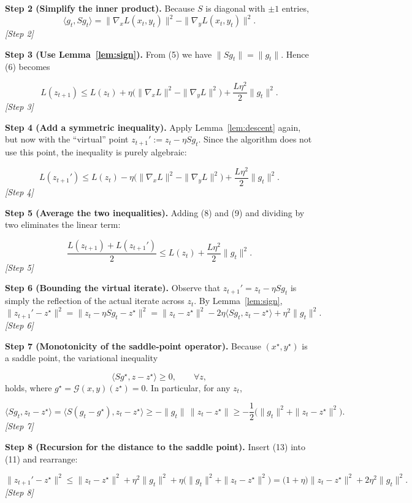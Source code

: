 \documentclass{article}
\newcommand{\G}{\mathcal{G}(x,y)}
\begin{document}
\noindent\textbf{Step 2 (Simplify the inner product).}  
Because \(S\) is diagonal with \(\pm1\) entries,
\[
\langle g_t,Sg_t\rangle
= \|\nabla_x L(x_t,y_t)\|^{2}-\|\nabla_y L(x_t,y_t)\|^{2}.
\tag{7}
\]
\textit{[Step 2]}

\noindent\textbf{Step 3 (Use Lemma~\ref{lem:sign}).}  
From (5) we have \(\|Sg_t\|=\|g_t\|\). Hence (6) becomes  

\[
L(z_{t+1})\le L(z_t)+\eta\big(\|\nabla_x L\|^{2}-\|\nabla_y L\|^{2}\big)
+\frac{L\eta^{2}}{2}\|g_t\|^{2}.
\tag{8}
\]
\textit{[Step 3]}

\noindent\textbf{Step 4 (Add a symmetric inequality).}  
Apply Lemma~\ref{lem:descent} again, but now with the “virtual” point \(z_{t+1}':=z_t-\eta Sg_t\). Since the algorithm does not use this point, the inequality is purely algebraic:

\[
L(z_{t+1}')\le L(z_t)-\eta\big(\|\nabla_x L\|^{2}-\|\nabla_y L\|^{2}\big)
+\frac{L\eta^{2}}{2}\|g_t\|^{2}.
\tag{9}
\]
\textit{[Step 4]}

\noindent\textbf{Step 5 (Average the two inequalities).}  
Adding (8) and (9) and dividing by two eliminates the linear term:

\[
\frac{L(z_{t+1})+L(z_{t+1}')}{2}
\le L(z_t)+\frac{L\eta^{2}}{2}\|g_t\|^{2}.
\tag{10}
\]
\textit{[Step 5]}

\noindent\textbf{Step 6 (Bounding the virtual iterate).}  
Observe that \(z_{t+1}'=z_t-\eta Sg_t\) is simply the reflection of the actual iterate across \(z_t\). By Lemma~\ref{lem:sign},
\[
\|z_{t+1}'-z^{\star}\|^{2}
=\|z_t-\eta Sg_t-z^{\star}\|^{2}
=\|z_t-z^{\star}\|^{2}-2\eta\langle Sg_t, z_t-z^{\star}\rangle+\eta^{2}\|g_t\|^{2}.
\tag{11}
\]
\textit{[Step 6]}

\noindent\textbf{Step 7 (Monotonicity of the saddle‑point operator).}  
Because \((x^{\star},y^{\star})\) is a saddle point, the variational inequality  

\[
\langle Sg^{\star},z-z^{\star}\rangle\ge0,\qquad\forall z,
\tag{12}
\]
holds, where \(g^{\star}= \G(z^{\star})=0\). In particular, for any \(z_t\),

\[
\langle Sg_t, z_t-z^{\star}\rangle
= \langle S(g_t-g^{\star}), z_t-z^{\star}\rangle
\ge -\|g_t\|\,\|z_t-z^{\star}\|
\ge -\frac{1}{2}\big(\|g_t\|^{2}+\|z_t-z^{\star}\|^{2}\big).
\tag{13}
\]
\textit{[Step 7]}

\noindent\textbf{Step 8 (Recursion for the distance to the saddle point).}  
Insert (13) into (11) and rearrange:

\[
\|z_{t+1}'-z^{\star}\|^{2}
\le \|z_t-z^{\star}\|^{2}
+\eta^{2}\|g_t\|^{2}
+\eta\big(\|g_t\|^{2}+\|z_t-z^{\star}\|^{2}\big)
=\big(1+\eta\big)\|z_t-z^{\star}\|^{2}+2\eta^{2}\|g_t\|^{2}.
\tag{14}
\]
\textit{[Step 8]}
\end{document}
